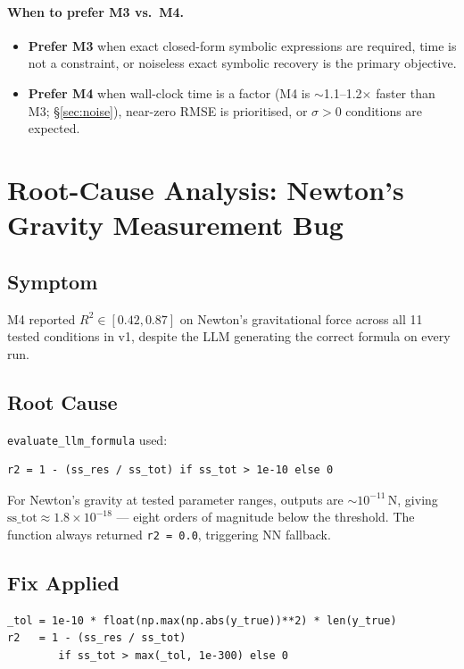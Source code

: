 \documentclass[twoside,11pt]{article}
\newcommand{\Rsq}{R^{2}}
\begin{document}
\paragraph{When to prefer M3 vs.\ M4.}
\begin{itemize}
\item \textbf{Prefer M3} when exact closed-form symbolic expressions are
  required, time is not a constraint, or noiseless exact symbolic recovery
  is the primary objective.
\item \textbf{Prefer M4} when wall-clock time is a factor
  (M4 is $\sim$1.1--1.2$\times$ faster than M3; \S\ref{sec:noise}), near-zero RMSE is prioritised, or $\sigma>0$ conditions are
  expected.
\end{itemize}

\section{Root-Cause Analysis: Newton's Gravity Measurement Bug}
\label{sec:bugfix}

\subsection{Symptom}

M4 reported $\Rsq \in [0.42, 0.87]$ on Newton's gravitational force across
all 11 tested conditions in v1, despite the LLM generating the correct formula
on every run.

\subsection{Root Cause}

\texttt{evaluate\_llm\_formula} used:
\begin{verbatim}
r2 = 1 - (ss_res / ss_tot) if ss_tot > 1e-10 else 0
\end{verbatim}
For Newton's gravity at tested parameter ranges, outputs are $\sim 10^{-11}$\,N,
giving $\mathrm{ss\_tot} \approx 1.8 \times 10^{-18}$ — eight orders of
magnitude below the threshold.  The function always returned
\texttt{r2 = 0.0}, triggering NN fallback.

\subsection{Fix Applied}

\begin{verbatim}
_tol = 1e-10 * float(np.max(np.abs(y_true))**2) * len(y_true)
r2   = 1 - (ss_res / ss_tot)
        if ss_tot > max(_tol, 1e-300) else 0
\end{verbatim}
\end{document}
